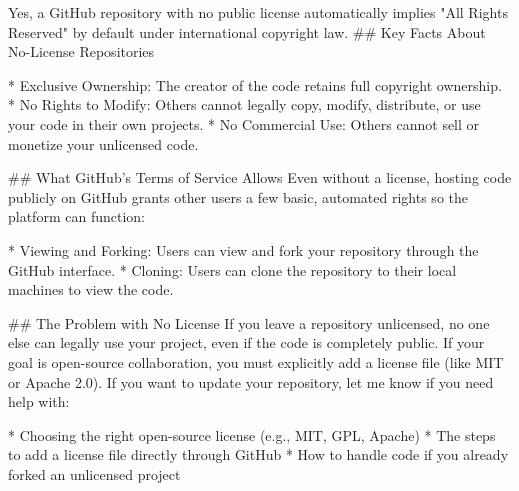 Yes, a GitHub repository with no public license automatically implies "All Rights Reserved" by default under international copyright law.
## Key Facts About No-License Repositories

* Exclusive Ownership: The creator of the code retains full copyright ownership.
* No Rights to Modify: Others cannot legally copy, modify, distribute, or use your code in their own projects.
* No Commercial Use: Others cannot sell or monetize your unlicensed code.

## What GitHub's Terms of Service Allows
Even without a license, hosting code publicly on GitHub grants other users a few basic, automated rights so the platform can function:

* Viewing and Forking: Users can view and fork your repository through the GitHub interface.
* Cloning: Users can clone the repository to their local machines to view the code.

## The Problem with No License
If you leave a repository unlicensed, no one else can legally use your project, even if the code is completely public. If your goal is open-source collaboration, you must explicitly add a license file (like MIT or Apache 2.0).
If you want to update your repository, let me know if you need help with:

* Choosing the right open-source license (e.g., MIT, GPL, Apache)
* The steps to add a license file directly through GitHub
* How to handle code if you already forked an unlicensed project



